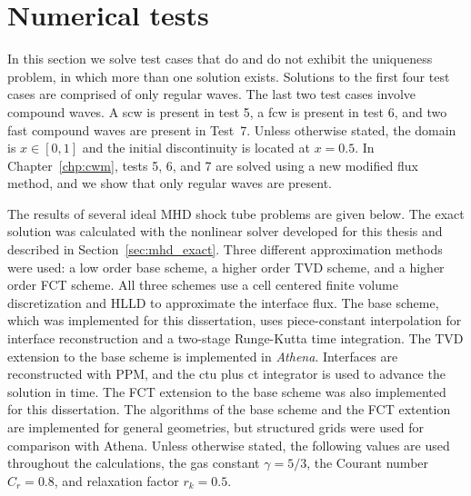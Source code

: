 \section[Numerical tests]{Numerical tests}
\label{sec:num_test}
In this section we solve test cases that do and do not exhibit the uniqueness problem, in which more than one solution exists.  Solutions to the first four test cases are comprised of only regular waves.  The last two test cases involve compound waves.  A \gls{scw} is present in test 5, a \gls{fcw} is present in test 6, and two fast compound waves are present in Test~7.  Unless otherwise stated, the domain is $x\in [0,1]$ and the initial discontinuity is located at $x=0.5$.  In Chapter~\ref{chp:cwm}, tests 5, 6, and 7 are solved using a new modified flux method, and we show that only regular waves are present.
  
The results of several ideal MHD shock tube problems are given below.  The exact solution was calculated with the nonlinear solver developed for this thesis and described in Section~\ref{sec:mhd_exact}.  Three different approximation methods were used: a low order base scheme, a higher order TVD scheme, and a higher order FCT scheme.  All three schemes use a cell centered finite volume discretization and HLLD to approximate the interface flux.  The base scheme, which was implemented for this dissertation,  uses piece-constant interpolation for interface reconstruction and a two-stage Runge-Kutta time integration.  The TVD extension to the base scheme is implemented in \emph{Athena}.  Interfaces are reconstructed with PPM, and the \gls{ctu} plus \gls{ct} integrator is used to advance the solution in time.  The FCT extension to the base scheme was also implemented for this dissertation.  The algorithms of the base scheme and the FCT extention are implemented for general geometries, but structured grids were used for comparison with Athena.  Unless otherwise stated, the following values are used throughout the calculations, the gas constant $\gamma = 5/3$, the Courant number $C_r = 0.8$, and relaxation factor $r_k = 0.5$.

